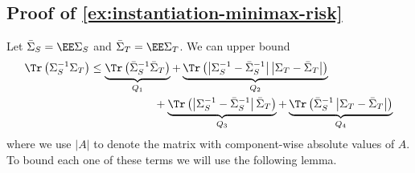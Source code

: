 \subsection{Proof of \cref{ex:instantiation-minimax-risk}}\label{app:proof-instantiation-minimax-risk} Let $\bar \Sigma _S = \EE \Sigma_S$ and $ \bar \Sigma_T  = \EE \Sigma_T$. We can upper bound 
\begin{align}\begin{split}\label{eq:break-apart-trace}
    \Tr\left(\Sigma_S^{-1} \Sigma_T\right) & \leq    \underbrace{\Tr\left(\bar \Sigma_S^{-1} \bar \Sigma_T\right)}_{Q_1} +\underbrace{\Tr\left( \left|\Sigma_S^{-1} - \bar \Sigma_S^{-1}\right| \left| \Sigma_T - \bar \Sigma_T\right| \right)}_{Q_2} \\ & \hspace{2cm} + \underbrace{\Tr\left(\left|\Sigma_S^{-1} - \bar \Sigma_S^{-1}\right| \bar \Sigma_T\right)}_{Q_3} + \underbrace{\Tr\left(\bar \Sigma_S^{-1}\left|\Sigma_T - \bar \Sigma_T\right|\right)}_{Q_4}
    \end{split}
\end{align}
where we use $|A|$ to denote the matrix with component-wise absolute values of $A.$ To bound each one of these terms we will use the following lemma. 


